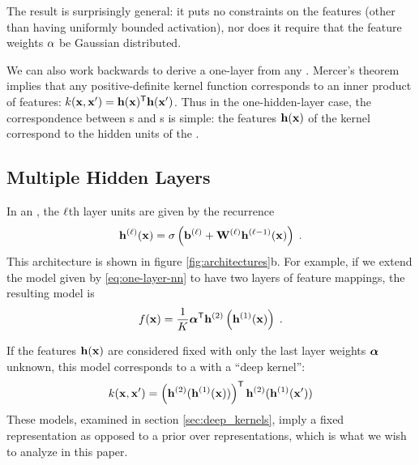 The result is surprisingly general:
it puts no constraints on the features (other than having uniformly bounded activation), nor does it require that the feature weights $\alpha$ be Gaussian distributed.  

We can also work backwards to derive a one-layer \MLP{} from any \gp{}.
Mercer's theorem implies that any positive-definite kernel function corresponds to an inner product of features: $k({\bf{x}}, {\bf{x}}') = {\bf{h}}({\bf{x}}) ^{\mathsf{T}} {\bf{h}}({\bf{x}}')$.
%
Thus in the one-hidden-layer case, the correspondence between \MLP{}s and \gp{}s is simple:
the features ${\bf{h}}({\bf{x}})$ of the kernel correspond to the hidden units of the \MLP{}.


\subsection{Multiple Hidden Layers}

In an \MLP{}, the $\ell$th layer units are given by the recurrence
%
\begin{align}
{\bf{h}}^{(\ell)}({\bf{x}}) = \sigma \left( {\bf{b}}^{(\ell)} + \mathbf{W}^{(\ell)} {\bf{h}}^{(\ell-1)}({\bf{x}}) \right) \;.
\label{eq:nextlayer}
\end{align}
This architecture is shown in figure \ref{fig:architectures}b. 
%
For example, if we extend the model given by \eqref{eq:one-layer-nn} to have two layers of feature mappings,  the resulting model is
%
\begin{align}
f({\bf{x}}) = \frac{1}{K}{\mathbf {\boldsymbol{\alpha}}}^{\mathsf{T}} {\bf{h}}^{(2)}\left( {\bf{h}}^{(1)}({\bf{x}}) \right) \;.
\label{eq:mutli-layer-nn}
\end{align}

If the features ${\bf{h}}({\bf{x}})$ are considered fixed with only the last layer weights ${\boldsymbol{\alpha}}$ unknown, this model corresponds to a \gp{} with a ``deep kernel'': 
\begin{align}
k({\bf{x}}, {\bf{x}}') = \left( {\bf{h}}^{(2)} ( {\bf{h}}^{(1)}({\bf{x}}) ) \right) ^{\mathsf{T}} {\bf{h}}^{(2)} ({\bf{h}}^{(1)}({\bf{x}}') )
\end{align}
These models, examined in section \ref{sec:deep_kernels}, imply a fixed representation as opposed to a prior over representations, which is what we wish to analyze in this paper.


